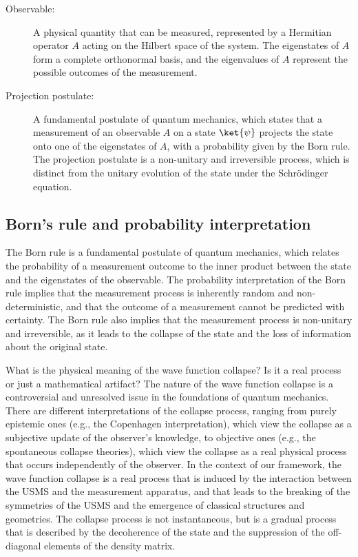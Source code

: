 \begin{tcolorbox}[colback=blue!5!white,colframe=blue!75!black,title=New terms]
    \begin{description}
        \item[Observable:] A physical quantity that can be measured, represented by a Hermitian operator $A$ acting on the Hilbert space of the system. The eigenstates of $A$ form a complete orthonormal basis, and the eigenvalues of $A$ represent the possible outcomes of the measurement.
        \item[Projection postulate:] A fundamental postulate of quantum mechanics, which states that a measurement of an observable $A$ on a state $\ket{\psi}$ projects the state onto one of the eigenstates of $A$, with a probability given by the Born rule. The projection postulate is a non-unitary and irreversible process, which is distinct from the unitary evolution of the state under the Schrödinger equation.
    \end{description}
\end{tcolorbox}

\subsection{Born's rule and probability interpretation}
The Born rule is a fundamental postulate of quantum mechanics, which relates the probability of a measurement outcome to the inner product between the state and the eigenstates of the observable. The probability interpretation of the Born rule implies that the measurement process is inherently random and non-deterministic, and that the outcome of a measurement cannot be predicted with certainty. The Born rule also implies that the measurement process is non-unitary and irreversible, as it leads to the collapse of the state and the loss of information about the original state.

\begin{tcolorbox}[colback=green!5!white,colframe=green!75!black,title=Question]
    What is the physical meaning of the wave function collapse? Is it a real process or just a mathematical artifact?
    \tcblower
    The nature of the wave function collapse is a controversial and unresolved issue in the foundations of quantum mechanics. There are different interpretations of the collapse process, ranging from purely epistemic ones (e.g., the Copenhagen interpretation), which view the collapse as a subjective update of the observer's knowledge, to objective ones (e.g., the spontaneous collapse theories), which view the collapse as a real physical process that occurs independently of the observer. In the context of our framework, the wave function collapse is a real process that is induced by the interaction between the USMS and the measurement apparatus, and that leads to the breaking of the symmetries of the USMS and the emergence of classical structures and geometries. The collapse process is not instantaneous, but is a gradual process that is described by the decoherence of the state and the suppression of the off-diagonal elements of the density matrix.
\end{tcolorbox}

